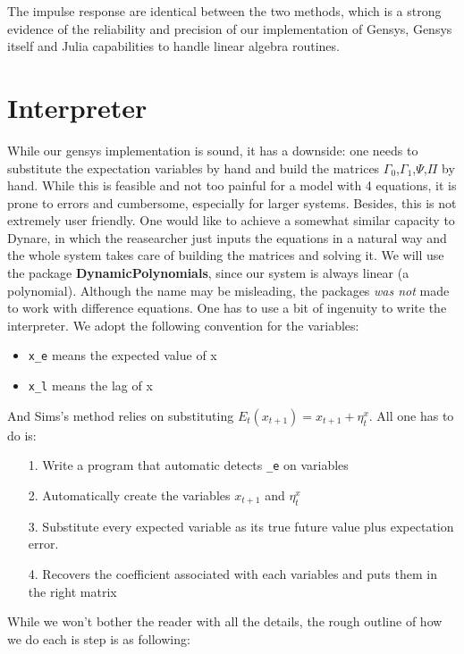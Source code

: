 \documentclass[12pt,a4paper]{article}
\begin{document}
The impulse response are identical between the two methods, which is a strong evidence of the reliability and precision of our implementation of Gensys, Gensys itself and Julia capabilities to handle linear algebra routines.

\section{Interpreter}
While our gensys implementation is sound, it has a downside: one needs to substitute the expectation variables by hand and build the matrices $\Gamma_0$,$\Gamma_1$,$\Psi$,$\Pi$ by hand. While this is feasible and not too painful for a model with 4 equations, it is prone to errors and cumbersome, especially for larger systems. Besides, this is not extremely user friendly. One would like to achieve a somewhat similar capacity to Dynare, in which the reasearcher just inputs the equations in a natural way and the whole system takes care of building the matrices and solving it. We will use the package \textbf{DynamicPolynomials}, since our system is always linear (a polynomial). Although the name may be misleading, the packages \emph{was not} made to work with difference equations. One has to use a bit of ingenuity to write the interpreter. We adopt the following convention for the variables:

\begin{itemize}
\item \texttt{x\_e} means the expected value of x


\item \texttt{x\_l} means the lag of x

\end{itemize}
And Sims's method relies on substituting $E_t(x_{t+1}) = x_{t+1} + \eta_t^{x}$. All one has to do is:

\begin{itemize}
\item[1. ] Write a program that automatic detects \texttt{\_e} on variables


\item[2. ] Automatically create the variables $x_{t+1}$ and $\eta_t^x$


\item[3. ] Substitute every expected variable as its true future value plus expectation error.


\item[4. ] Recovers the coefficient associated with each variables and puts them in the right matrix

\end{itemize}
While we won't bother the reader with all the details, the rough outline of how we do each is step is as following:
\end{document}
